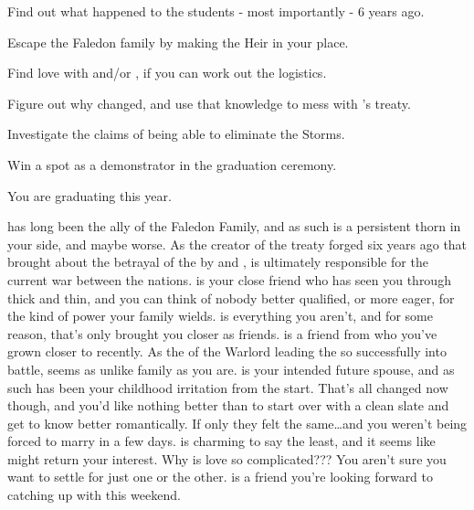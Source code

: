 \documentclass[char]{GL2020}
\begin{document}


\begin{itemz}[Goals]
\item Find out what happened to the students - most importantly \cHeirSibling{} - 6 years ago.
\item Escape the Faledon family by making \cAmbition{} the Heir in your place.
\item Find love with \cChupStudent{} and/or \cPresident{}, if you can work out the logistics.
\item Figure out why \cLoud{} changed, and use that knowledge to mess with \cDiplomat{}’s treaty.
\item Investigate the claims of being able to eliminate the Storms.
\item Win a spot as a demonstrator in the graduation ceremony.
\end{itemz}

\begin{itemz}[Notes]
	\item You are graduating this year.
\end{itemz}

\begin{contacts}
	\contact{\cDiplomat{}} has long been the ally of the Faledon Family, and as such is a persistent thorn in your side, and maybe worse. As the creator of the treaty forged six years ago that brought about the betrayal of the \pShip{} by \pTech{} and \pFarm{}, \cDiplomat{} is ultimately responsible for the current war between the nations.
	\contact{\cAmbition{}} is your close friend who has seen you through thick and thin, and you can think of nobody better qualified, or more eager, for the kind of power your family wields.  \cAmbition{} is everything you aren’t, and for some reason, that’s only brought you closer as friends.
	\contact{\cWarlordDaughter{}} is a friend from \pShip{} who you’ve grown closer to recently.  As the \cWarlordDaughter{\child} of the Warlord leading the \pShippies{} so successfully into battle, \cWarlordDaughter{} seems as unlike \cWarlordDaughter{\their} family as you are.
	\contact{\cChupStudent{}} is your intended future spouse, and as such has been your childhood irritation from the start. That’s all changed now though, and you’d like nothing better than to start over with a clean slate and get to know \cChupStudent{\them} better romantically. If only they felt the same\ldots and you weren’t being forced to marry in a few days.
	\contact{\cPresident{}} is charming to say the least, and it seems like \cPresident{\they} might return your interest. Why is love so complicated??? You aren’t sure you want to settle for just one or the other.
	\contact{\cAssistantScientist{}} is a friend you're looking forward to catching up with this weekend.
\end{contacts}
	
\end{document}
